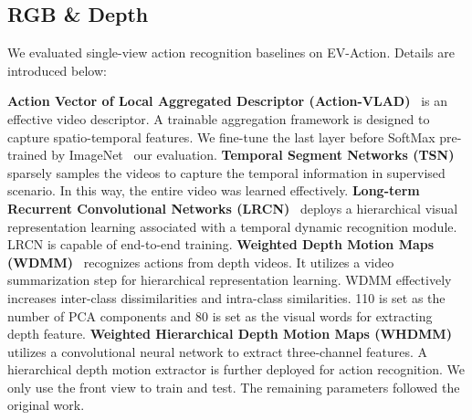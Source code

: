 \documentclass[a4paper, 10pt, conference]{ieeeconf}      \usepackage{FG2020}
\begin{document}
\begin{table}[!tp]
\begin{center}
\caption{EMG classification accuracy based on different dimension reduction (Dim-Red) approaches and classifiers.}\label{table:EMG}
\vspace{-1mm}
\end{center}
\vspace{-5mm}
\end{table}


\subsection{RGB \& Depth}
We evaluated single-view action recognition baselines on EV-Action. Details are introduced below:

\noindent\textbf{Action Vector of Local Aggregated Descriptor (Action-VLAD)}~\cite{ActionVLAD} is an effective video descriptor. A trainable aggregation framework is designed to capture spatio-temporal features. We fine-tune the last layer before SoftMax pre-trained by ImageNet~\cite{imagenet} our evaluation. \textbf{Temporal Segment Networks (TSN)}~\cite{TSN} sparsely samples the videos to capture the temporal information in supervised scenario. In this way, the entire video was learned effectively. \textbf{Long-term Recurrent Convolutional Networks (LRCN)}~\cite{LRCN} deploys a hierarchical visual representation learning associated with a temporal dynamic recognition module. LRCN is capable of end-to-end training. \textbf{Weighted Depth Motion Maps (WDMM)}~\cite{Dynamic3D} recognizes actions from depth videos. It utilizes a video summarization step for hierarchical representation learning. WDMM effectively increases inter-class dissimilarities and intra-class similarities. 110 is set as the number of PCA components and 80 is set as the visual words for extracting depth feature. \textbf{Weighted Hierarchical Depth Motion Maps (WHDMM)}~\cite{RGBD_wang2016action} utilizes a convolutional neural network to extract three-channel features. A hierarchical depth motion extractor is further deployed for action recognition. We only use the front view to train and test. The remaining parameters followed the original work.
\end{document}
